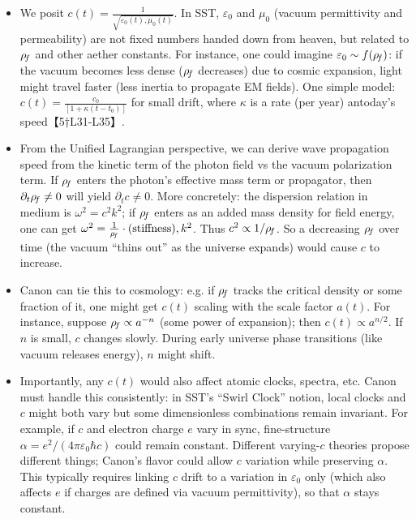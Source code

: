 \documentclass[11pt]{article}
\begin{document}
\begin{itemize}

\item 
We posit $c(t) = \frac{1}{\sqrt{\varepsilon_0(t),\mu_0(t)}}$. In SST, $\varepsilon_0$ and $\mu_0$ (vacuum permittivity and permeability) are not fixed numbers handed down from heaven, but related to $\rho_{\!f}$ and other aether constants. For instance, one could imagine $\varepsilon_0 \sim f(\rho_{\!f})$: if the vacuum becomes less dense ($\rho_{\!f}$ decreases) due to cosmic expansion, light might travel faster (less inertia to propagate EM fields). One simple model: $c(t) = \frac{c_0}{[1 + \kappa (t - t_0)]}$ for small drift, where $\kappa$ is a rate (per year) antoday’s speed【5†L31-L35】.




\item 
From the Unified Lagrangian perspective, we can derive wave propagation speed from the kinetic term of the photon field vs the vacuum polarization term. If $\rho_{\!f}$ enters the photon’s effective mass term or propagator, then $\partial_t \rho_{\!f} \neq 0$ will yield $\partial_t c \neq 0$. More concretely: the dispersion relation in medium is $\omega^2 = c^2 k^2$; if $\rho_{\!f}$ enters as an added mass density for field energy, one can get $\omega^2 = \frac{1}{\rho_{\!f}}\cdot (\text{stiffness}),k^2$. Thus $c^2 \propto 1/\rho_{\!f}$. So a decreasing $\rho_{\!f}$ over time (the vacuum “thins out” as the universe expands) would cause $c$ to increase.




\item 
Canon can tie this to cosmology: e.g. if $\rho_{\!f}$ tracks the critical density or some fraction of it, one might get $c(t)$ scaling with the scale factor $a(t)$. For instance, suppose $\rho_{\!f} \propto a^{-n}$ (some power of expansion); then $c(t) \propto a^{n/2}$. If $n$ is small, $c$ changes slowly. During early universe phase transitions (like vacuum releases energy), $n$ might shift.




\item 
Importantly, any $c(t)$ would also affect atomic clocks, spectra, etc. Canon must handle this consistently: in SST’s “Swirl Clock” notion, local clocks and $c$ might both vary but some dimensionless combinations remain invariant. For example, if $c$ and electron charge $e$ vary in sync, fine-structure $\alpha = e^2/(4\pi \varepsilon_0 \hbar c)$ could remain constant. Different varying-$c$ theories propose different things; Canon’s flavor could allow $c$ variation while preserving $\alpha$. This typically requires linking $c$ drift to a variation in $\varepsilon_0$ only (which also affects $e$ if charges are defined via vacuum permittivity), so that $\alpha$ stays constant.





\end{itemize}
\end{document}

